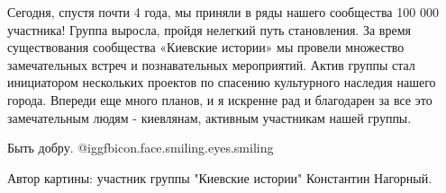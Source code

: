 Сегодня, спустя почти 4 года, мы приняли в ряды нашего сообщества 100 000
участника! Группа выросла, пройдя нелегкий путь становления. За время
существования сообщества «Киевские истории» мы провели множество замечательных
встреч и познавательных мероприятий. Актив группы стал инициатором нескольких
проектов по спасению культурного наследия нашего города. Впереди еще много
планов, и я искренне рад и благодарен за все это замечательным людям -
киевлянам, активным участникам нашей группы. 

Быть добру.  @igg{fbicon.face.smiling.eyes.smiling} 

Автор картины: участник группы "Киевские истории" Константин Нагорный.

